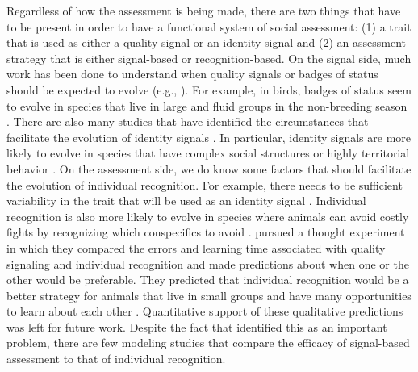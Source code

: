 Regardless of how the assessment is being made, there are two things that have to be present in order to have a functional system of social assessment: (1) a trait that is used as either a quality signal or an identity signal and (2) an assessment strategy that is either signal-based or recognition-based.  On the signal side, much work has been done to understand when quality signals or badges of status should be expected to evolve (e.g., \citep{Whitfield:1987tg,Rohwer:1975fk,Rohwer:1982fk,Dawkins:1991ly,Johnstone:1995vn,Lachmann:1998fk,Tibbetts:2009kx}). For example, in birds, badges of status seem to evolve in species that live in large and fluid groups in the non-breeding season \citep{Tibbetts:2009kx}. There are also many studies that have identified the circumstances that facilitate the evolution of identity signals \citep{Rohwer:1975fk,Whitfield:1987tg,Sheehan:2009we,Pollard:2011te,Sheehan:2014fk}. In particular, identity signals are more likely to evolve in species that have complex social structures or highly territorial behavior \citep{Tibbetts2007IndividualDifferent}. On the assessment side, we do know some factors that should facilitate the evolution of individual recognition. For example, there needs to be sufficient variability in the trait that will be used as an identity signal \citep{Sheehan:2014fk}. Individual recognition is also more likely to evolve in species where animals can avoid costly fights by recognizing which conspecifics to avoid \citep{DEttorre:2005nu}.  \citet{sheehan2016evotradeoff} pursued a thought experiment in which they compared the errors and learning time associated with quality signaling and individual recognition and made predictions about when one or the other would be preferable. 
They predicted that individual recognition would be a better strategy for animals that live in small groups and have many opportunities to learn about each other \citep{sheehan2016evotradeoff}. Quantitative support of these qualitative predictions was left for future work. Despite the fact that \citet{sheehan2016evotradeoff} identified this as an important problem, there are few modeling studies that compare the efficacy of signal-based assessment to that of individual recognition. 

